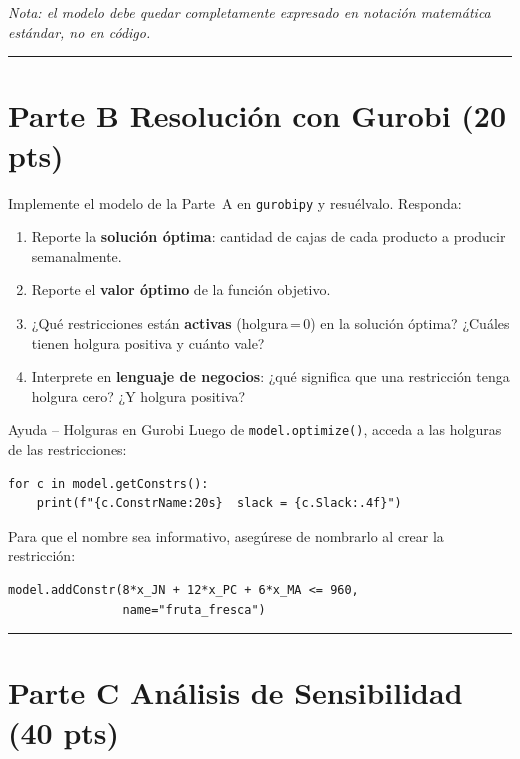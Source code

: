 \documentclass[12pt,a4paper]{article}
\begin{document}
\noindent\textit{Nota: el modelo debe quedar completamente expresado en
notación matemática estándar, no en código.}

\noindent\rule{\linewidth}{0.4pt}

\section*{Parte B \quad Resolución con Gurobi \hfill\normalfont\normalsize(20 pts)}

Implemente el modelo de la Parte~A en \texttt{gurobipy} y resuélvalo.
Responda:

\begin{enumerate}[label=\alph*), leftmargin=*, topsep=2pt]
    \item Reporte la \textbf{solución óptima}: cantidad de cajas de cada
          producto a producir semanalmente.
    \item Reporte el \textbf{valor óptimo} de la función objetivo.
    \item ¿Qué restricciones están \textbf{activas} (holgura\,=\,0) en la
          solución óptima? ¿Cuáles tienen holgura positiva y cuánto vale?
    \item Interprete en \textbf{lenguaje de negocios}: ¿qué significa que
          una restricción tenga holgura cero? ¿Y holgura positiva?
\end{enumerate}

\begin{ayuda}{Ayuda -- Holguras en Gurobi}
\vspace{2pt}
Luego de \texttt{model.optimize()}, acceda a las holguras de las restricciones:
\begin{lstlisting}
for c in model.getConstrs():
    print(f"{c.ConstrName:20s}  slack = {c.Slack:.4f}")
\end{lstlisting}
Para que el nombre sea informativo, asegúrese de nombrarlo al crear la
restricción:
\begin{lstlisting}
model.addConstr(8*x_JN + 12*x_PC + 6*x_MA <= 960,
                name="fruta_fresca")
\end{lstlisting}
\end{ayuda}

\noindent\rule{\linewidth}{0.4pt}

\section*{Parte C \quad Análisis de Sensibilidad \hfill\normalfont\normalsize(40 pts)}
\end{document}
